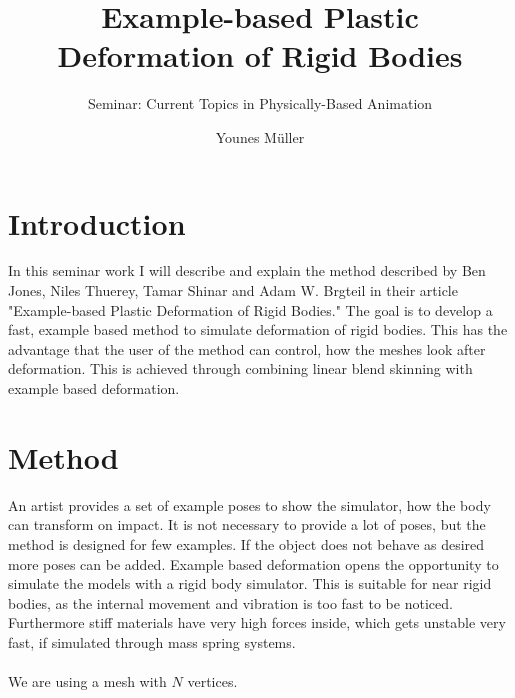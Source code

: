 \documentclass[
	11pt, 
	DIV10,
	a4paper, 
	oneside, 
	headings=normal, 
	captions=tableheading,
	final, 
	numbers=noenddot
]{scrartcl}
\title{Example-based Plastic Deformation of Rigid Bodies}
\subtitle{\vspace{0.5cm}Seminar: Current Topics in Physically-Based Animation}
\author{Younes Müller}
\begin{document}
\maketitle
\tableofcontents
\newpage


\section{Introduction}
In this seminar work I will describe and explain the method described by Ben Jones, Niles Thuerey, Tamar Shinar and Adam W. Brgteil in their article "Example-based Plastic Deformation of Rigid Bodies."\cite{paper}
The goal is to develop a fast, example based method to simulate deformation of rigid bodies. This has the advantage that the user of the method can control, how the meshes look after deformation.
This is achieved through combining linear blend skinning with example based deformation.
\section{Method}
An artist provides a set of example poses to show the simulator, how the body can transform on impact.
It is not necessary to provide a lot of poses, but the method is designed for few examples. If the object does not behave as desired more poses can be added.
Example based deformation opens the opportunity to simulate the models with a rigid body simulator.
This is suitable for near rigid bodies, as the internal movement and vibration is too fast to be noticed. Furthermore stiff materials have very high forces inside, which gets unstable very fast, if simulated through mass spring systems. \\ \\
We are using a mesh with $N$ vertices.







\end{document}
